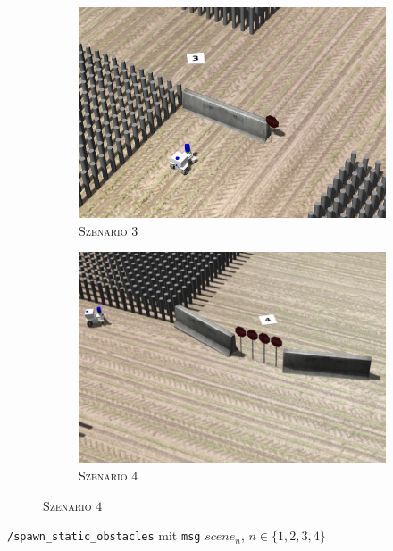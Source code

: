 \documentclass{beamer}
\newcommand{\code}[1]{\colorbox{light-gray}{\texttt{#1}}}
\begin{document}
\begin{frame}
\begin{figure}[H]
\begin{subfigure}[b]{0.24\textwidth}
        \centering
        \includegraphics[width=\textwidth]{img/static_3.png}
        \caption{\textsc{Szenario $3$}}
        \label{fig:static_3}
    \end{subfigure}
    \hfill
    \begin{subfigure}[b]{0.24\textwidth}
        \centering
        \includegraphics[width=\textwidth]{img/static_4.png}
        \caption{\textsc{Szenario $4$}}
        \label{fig:static_4}
    \end{subfigure}
  \end{figure}
  \code{/spawn\_static\_obstacles} mit \code{msg} $scene_n$, $n \in \{1, 2, 3, 4\}$
  \begin{figure}[H]
    \centering
    \begin{subfigure}[b]{0.24\textwidth}
        \centering

\end{subfigure}
\end{figure}
\end{frame}
\end{document}
